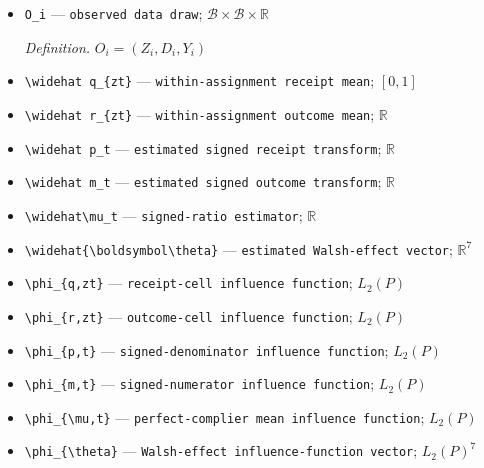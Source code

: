 \documentclass{article}
\begin{document}
\begin{itemize}
  \item \texttt{O\_\allowbreak{}i} --- \texttt{observed data draw}; \(\mathcal B\times\mathcal B\times\mathbb R\)
  \par\smallskip\noindent\emph{Definition.} \(O_i=(Z_i,D_i,Y_i)\)
  \item \texttt{\textbackslash{}\allowbreak{}widehat q\_\allowbreak{}\{zt\}\allowbreak{}} --- \texttt{within-\allowbreak{}assignment receipt mean}; \([0,1]\)
  \item \texttt{\textbackslash{}\allowbreak{}widehat r\_\allowbreak{}\{zt\}\allowbreak{}} --- \texttt{within-\allowbreak{}assignment outcome mean}; \(\mathbb R\)
  \item \texttt{\textbackslash{}\allowbreak{}widehat p\_\allowbreak{}t} --- \texttt{estimated signed receipt transform}; \(\mathbb R\)
  \item \texttt{\textbackslash{}\allowbreak{}widehat m\_\allowbreak{}t} --- \texttt{estimated signed outcome transform}; \(\mathbb R\)
  \item \texttt{\textbackslash{}\allowbreak{}widehat\textbackslash{}\allowbreak{}mu\_\allowbreak{}t} --- \texttt{signed-\allowbreak{}ratio estimator}; \(\mathbb R\)
  \item \texttt{\textbackslash{}\allowbreak{}widehat\{\textbackslash{}\allowbreak{}boldsymbol\textbackslash{}\allowbreak{}theta\}\allowbreak{}} --- \texttt{estimated Walsh-\allowbreak{}effect vector}; \(\mathbb R^7\)
  \item \texttt{\textbackslash{}\allowbreak{}phi\_\allowbreak{}\{q,\allowbreak{}zt\}\allowbreak{}} --- \texttt{receipt-\allowbreak{}cell influence function}; \(L_2(P)\)
  \item \texttt{\textbackslash{}\allowbreak{}phi\_\allowbreak{}\{r,\allowbreak{}zt\}\allowbreak{}} --- \texttt{outcome-\allowbreak{}cell influence function}; \(L_2(P)\)
  \item \texttt{\textbackslash{}\allowbreak{}phi\_\allowbreak{}\{p,\allowbreak{}t\}\allowbreak{}} --- \texttt{signed-\allowbreak{}denominator influence function}; \(L_2(P)\)
  \item \texttt{\textbackslash{}\allowbreak{}phi\_\allowbreak{}\{m,\allowbreak{}t\}\allowbreak{}} --- \texttt{signed-\allowbreak{}numerator influence function}; \(L_2(P)\)
  \item \texttt{\textbackslash{}\allowbreak{}phi\_\allowbreak{}\{\textbackslash{}\allowbreak{}mu,\allowbreak{}t\}\allowbreak{}} --- \texttt{perfect-\allowbreak{}complier mean influence function}; \(L_2(P)\)
  \item \texttt{\textbackslash{}\allowbreak{}phi\_\allowbreak{}\{\textbackslash{}\allowbreak{}theta\}\allowbreak{}} --- \texttt{Walsh-\allowbreak{}effect influence-\allowbreak{}function vector}; \(L_2(P)^7\)

\end{itemize}
\end{document}
